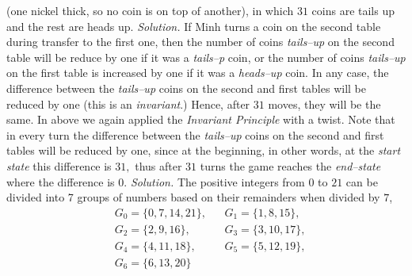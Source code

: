 \begin{multicols}{2}
{	(one nickel thick, so no coin is on top of another), in which $31$ coins are tails up and the rest are heads up.}
	\vskip 0.1cm
	\vskip 0.2cm
	\textit{Solution.}
	If Minh turns a coin on the second table during transfer to the first one,
	then the number of coins \textit{tails--up} on the second table will be reduce by one if it was a \textit{tails--p} coin,
	or the number of coins \textit{tails--up} on the first table is increased by one if it was a \textit{heads--up} coin.
	In any case, the difference between the \textit{tails--up} coins on the second and first tables will be reduced by one
	(this is an \textit{invariant}.) Hence, after $31$ moves, they will be the same.
	\vskip 0.1cm
	In above we again applied the \textit{Invariant Principle} with a twist.
	Note that in every turn the difference between the \textit{tails--up} coins on the second and first tables will be reduced by one,
	since at the beginning, in other words, at the \textit{start state} this difference is $31,$
	thus after $31$ turns the game reaches the \textit{end--state} where the difference is $0.$
	\vskip 0.2cm
	\vskip 0.2cm
	\textit{Solution.}
	The positive integers from $0$ to $21$ can be divided into 7 groups of numbers based on their remainders when divided by $7$,
	\begin{align*}
		&G_0=\{0,7,14,21\}, &&G_1=\{1,8,15\},\\
		& G_2=\{2,9,16\}, &&G_3=\{3,10,17\},\\
		& G_4=\{4,11,18\},&&G_5=\{5,12,19\},\\
		& G_6=\{6,13,20\}

\end{align*}
\end{multicols}

